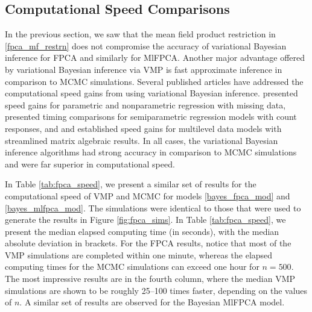 \documentclass[ba]{imsart}
\numberwithin{equation}{section}
\theoremstyle{plain}
\begin{document}

\subsection{Computational Speed Comparisons}
\label{sec:speed_comp}

In the previous section, we saw that the mean field product restriction in \eqref{fpca_mf_restrn} does not
compromise the accuracy of variational Bayesian inference for FPCA and similarly for MlFPCA. Another
major advantage offered by variational Bayesian inference via VMP is fast approximate inference in 
comparison to MCMC simulations. Several published articles have addressed the computational speed gains
from using variational Bayesian inference. \citet{faes11} presented speed gains for parametric and nonparametric
regression with missing data, \citet{luts15} presented timing comparisons for semiparametric regression
models with count responses, and
\citet{lee16} and \citet{nolanmw20} established speed gains for multilevel data models
with streamlined matrix algebraic results.
In all cases, the variational Bayesian inference algorithms had strong accuracy in
comparison to MCMC simulations and were far superior in computational speed.

In Table \ref{tab:fpca_speed}, we present a similar set of results for the computational speed of VMP and MCMC
for models \eqref{bayes_fpca_mod}
and \eqref{bayes_mlfpca_mod}. The simulations were identical to those that were used to generate the
results in Figure \ref{fig:fpca_sims}. In Table \ref{tab:fpca_speed},
we present the median elapsed computing time (in seconds),
with the median absolute deviation in brackets. For the FPCA results,
notice that most of the VMP simulations are completed within one minute, whereas the elapsed computing times
for the MCMC simulations can exceed one hour for $n = 500$.
The most impressive results are in the fourth column, where the median VMP simulations are shown to
be roughly 25--100 times faster, depending on the values of $n$. A similar set of results are observed
for the Bayesian MlFPCA model.
\end{document}

